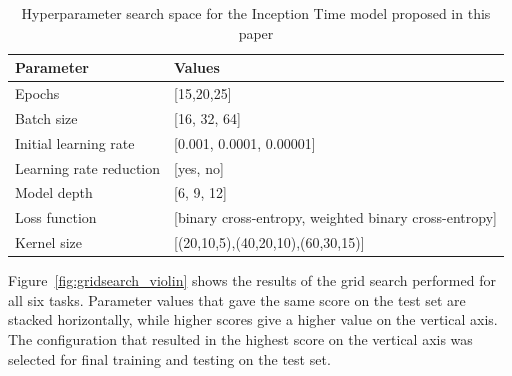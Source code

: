 \begin{table}[!hp]
\scriptsize
\centering
\caption{Hyperparameter search space for the Inception Time model proposed in this paper}
\begin{tabular}{ll}
\cellcolor[HTML]{C0C0C0}\textbf{Parameter} & \cellcolor[HTML]{C0C0C0}\textbf{Values}\\\hline
Epochs        & [15,20,25] \\
Batch size        & [16, 32, 64]  \\
Initial learning rate              & [0.001, 0.0001, 0.00001] \\
Learning rate reduction         & [yes, no]  \\
Model depth                & [6, 9, 12] \\
Loss function          & [binary cross-entropy, weighted binary cross-entropy]  \\
Kernel size      & [(20,10,5),(40,20,10),(60,30,15)]  \\\hline                              
\end{tabular}
\label{tab:HPsearchspace}
\end{table}

Figure~\ref{fig:gridsearch_violin} shows the results of the grid search performed for all six tasks. Parameter values that gave the same score on the test set are stacked horizontally, while higher scores give a higher value on the vertical axis. The configuration that resulted in the highest score on the vertical axis was selected for final training and testing on the test set.

